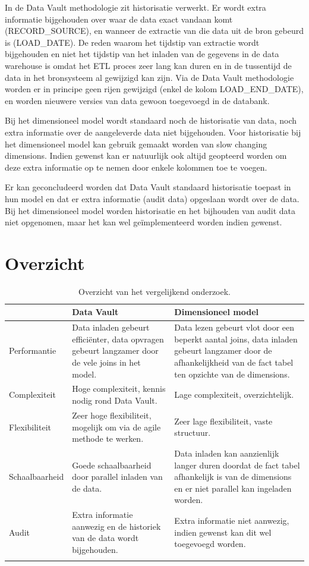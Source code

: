 In de Data Vault methodologie zit historisatie verwerkt. Er wordt extra informatie bijgehouden over waar de data exact vandaan komt (RECORD\_SOURCE), en wanneer de extractie van die data uit de bron gebeurd is (LOAD\_DATE). De reden waarom het tijdstip van extractie wordt bijgehouden en niet het tijdstip van het inladen van de gegevens in de data warehouse is omdat het ETL proces zeer lang kan duren en in de tussentijd de data in het bronsysteem al gewijzigd kan zijn. Via de Data Vault methodologie worden er in principe geen rijen gewijzigd (enkel de kolom LOAD\_END\_DATE), en worden nieuwere versies van data gewoon toegevoegd in de databank.

Bij het dimensioneel model wordt standaard noch de historisatie van data, noch extra informatie over de aangeleverde data niet bijgehouden. Voor historisatie bij het dimensioneel model kan gebruik gemaakt worden van slow changing dimensions. Indien gewenst kan er natuurlijk ook altijd geopteerd worden om deze extra informatie op te nemen door enkele kolommen toe te voegen. 

Er kan geconcludeerd worden dat Data Vault standaard historisatie toepast in hun model en dat er extra informatie (audit data) opgeslaan wordt over de data. Bij het dimensioneel model worden historisatie en het bijhouden van audit data niet opgenomen, maar het kan wel geïmplementeerd worden indien gewenst.
\section{Overzicht}
\begin{center}
	\renewcommand{\arraystretch}{2}%
	\begin{longtable}{  l  p{}  p{} }
		\ & \textbf{Data Vault} & \textbf{Dimensioneel model} \\ \hline
		Performantie & Data inladen gebeurt efficiënter, data opvragen gebeurt langzamer door de vele joins in het model. & Data lezen gebeurt vlot door een beperkt aantal joins, data inladen gebeurt langzamer door de afhankelijkheid van de fact tabel ten opzichte van de dimensions. \\ \hline
		Complexiteit & Hoge complexiteit, kennis nodig rond Data Vault. & Lage complexiteit, overzichtelijk. \\ \hline
		Flexibiliteit & Zeer hoge flexibiliteit, mogelijk om via de agile methode te werken. & Zeer lage flexibiliteit, vaste structuur. \\ \hline
		Schaalbaarheid & Goede schaalbaarheid door parallel inladen van de data. & Data inladen kan aanzienlijk langer duren doordat de fact tabel afhankelijk is van de dimensions en er niet parallel kan ingeladen worden.  \\ \hline
		Audit & Extra informatie aanwezig en de historiek van de data wordt bijgehouden. & Extra informatie niet aanwezig, indien gewenst kan dit wel toegevoegd worden. \\
		\caption{Overzicht van het vergelijkend onderzoek.}
		\label{tab:overzicht}
	\end{longtable}
\end{center}